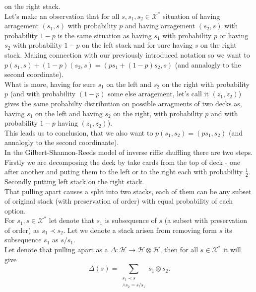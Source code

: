 \documentclass[a4paper, 12pt]{report}
\begin{document}
on the right stack. \\
Let's make an observation that for all $s, s_1, s_2 \in \mathcal{X}^*$ situation of having arragement
$(s_1, s)$ with probability $p$ and having arragement $(s_2, s)$ with probability $1-p$ is
the same situation as having $s_1$ with probability $p$ or having $s_2$ with probability $1 - p$ on the left
stack and for sure having $s$ on the right stack. Making connection with our previously introduced notation
so we want to $p(s_1, s) + (1-p)(s_2, s) = (ps_1 + (1-p)s_2, s)$ (and annalogly to the second coordinate).\\
What is more, having for sure $s_1$ on the left and $s_2$ on the right with probability $p$ (and
with probability $(1 - p)$ some else arragement, let's call it $(z_1, z_2)$) gives the same probabilty
distribution
on possible arragments of two decks as, having $s_1$ on the left and having $s_2$ on the
right, with probability $p$ and with probability $1-p$ having $(z_1,z_2)$).\\
This leads us to conclusion, that we also want to $p(s_1,s_2) = (ps_1, s_2)$ (and annalogly to the second
coordinaate). \\
In the Gilbert-Shannon-Reeds model of inverse riffle shuffling there are two steps. Firstly we are
decomposing the deck by take cards from the top of deck - one after another and puting them to the left
or to the right each with probability $\frac{1}{2}$. Secondly putting left stack on the right stack. \\
That pulling apart causes a split into two stacks, each of them can be any subset of original stack
(with preservation of order) with equal probability of each option. \\
For $s_1, s \in \mathcal{X}^*$ let denote that $s_1$ is subsequence of $s$ (a subset with preservation of
order) as $s_1 \prec s_2$. Let we denote a stack arisen from removing form $s$ its subsequence $s_1$ as
$s/s_1$. \\
Let denote that pulling apart as a $\Delta : \mathcal{H} \to \mathcal{H} \otimes \mathcal{H}$, then for all
$s \in \mathcal{X}^*$ it will give
\begin{equation*}
\Delta(s) = \sum_{\substack{s_1 \prec s \\ \land s_2 = s/s_1}}
s_1 \otimes s_2.
\end{equation*}
\end{document}
